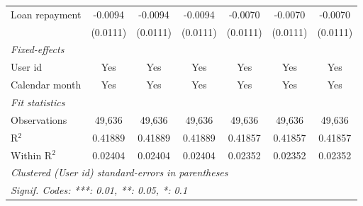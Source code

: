\begin{table}[htbp]
\begin{footnotesize}
\begin{tabular}{lcccccc}
         Loan repayment                   & -0.0094        & -0.0094        & -0.0094        & -0.0070        & -0.0070        & -0.0070\\
                                          & (0.0111)       & (0.0111)       & (0.0111)       & (0.0111)       & (0.0111)       & (0.0111)\\
         \midrule \emph{Fixed-effects} &   &   &   &   &   &  \\
         User id                          & Yes            & Yes            & Yes            & Yes            & Yes            & Yes\\
         Calendar month                   & Yes            & Yes            & Yes            & Yes            & Yes            & Yes\\
         \midrule \emph{Fit statistics} &   &   &   &   &   &  \\
         Observations                     & 49,636         & 49,636         & 49,636         & 49,636         & 49,636         & 49,636\\
         R$^2$                            & 0.41889        & 0.41889        & 0.41889        & 0.41857        & 0.41857        & 0.41857\\
         Within R$^2$                     & 0.02404        & 0.02404        & 0.02404        & 0.02352        & 0.02352        & 0.02352\\
         \midrule\midrule\multicolumn{7}{l}{\emph{Clustered (User id) standard-errors in parentheses}}\\
         \multicolumn{7}{l}{\emph{Signif. Codes: ***: 0.01, **: 0.05, *: 0.1}}\\
      \end{tabular}
   \end{footnotesize}
\end{table}


